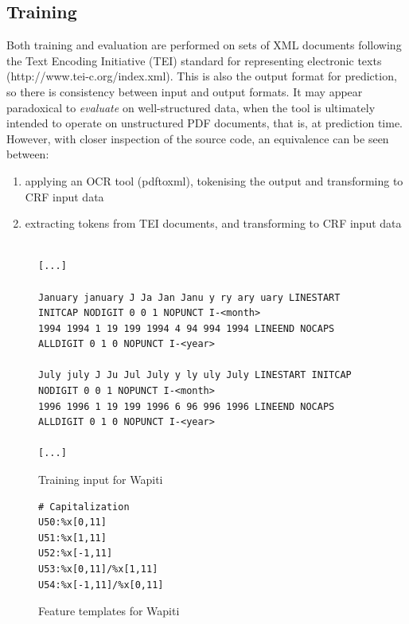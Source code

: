 \documentclass[11pt, oneside]{scrartcl}   	%
\begin{document}
\subsection{Training}

Both training and evaluation are performed on sets of XML documents following the Text Encoding Initiative (TEI) standard for representing electronic texts (http://www.tei-c.org/index.xml). This is also the output format for prediction, so there is consistency between input and output formats. It may appear paradoxical to \emph{evaluate} on well-structured data, when the tool is ultimately intended to operate on unstructured PDF documents, that is, at prediction time. However, with closer inspection of the source code, an equivalence can be seen between:

\begin{enumerate}
\item applying an OCR tool (pdftoxml), tokenising the output and transforming to CRF input data
\item extracting tokens from TEI documents, and transforming to CRF input data
\end{enumerate}

\begin{figure}
\begin{verbatim}

[...]

January january J Ja Jan Janu y ry ary uary LINESTART INITCAP NODIGIT 0 0 1 NOPUNCT I-<month>
1994 1994 1 19 199 1994 4 94 994 1994 LINEEND NOCAPS ALLDIGIT 0 1 0 NOPUNCT I-<year>
 
July july J Ju Jul July y ly uly July LINESTART INITCAP NODIGIT 0 0 1 NOPUNCT I-<month>
1996 1996 1 19 199 1996 6 96 996 1996 LINEEND NOCAPS ALLDIGIT 0 1 0 NOPUNCT I-<year>

[...]

\end{verbatim}
\caption{Training input for Wapiti}
\label{fig:traininput}
\end{figure}

\begin{figure}
\begin{verbatim}
# Capitalization
U50:%x[0,11]
U51:%x[1,11]
U52:%x[-1,11]
U53:%x[0,11]/%x[1,11]
U54:%x[-1,11]/%x[0,11]
\end{verbatim}

\caption{Feature templates for Wapiti}
\label{fig:template}
\end{figure}
\end{document}
